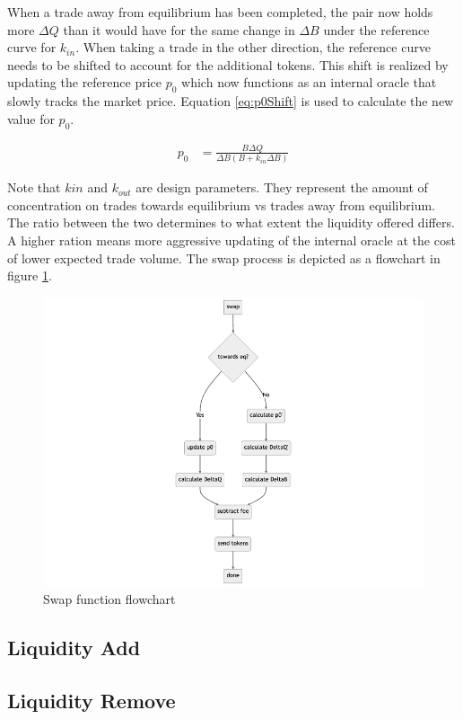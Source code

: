 When a trade away from equilibrium has been completed, the pair now holds more $\Delta Q$ than it would have for the same change in $\Delta B$ under the reference curve for $k_{in}$. When taking a trade in the other direction, the reference curve needs to be shifted to account for the additional tokens. This shift is realized by updating the reference price $p_0$ which now functions as an internal oracle that slowly tracks the market price. Equation \ref{eq:p0Shift} is used to calculate the new value for $p_0$.

\begin{align} \label{eq:p0Shift}
  p_0 &= \frac{B \Delta Q}{\Delta B \left( B + k_{in} \Delta B \right)}
\end{align}

Note that $k{in}$ and $k_{out}$ are design parameters. They represent the amount of concentration on trades towards equilibrium vs trades away from equilibrium. The ratio between the two determines to what extent the liquidity offered differs. A higher ration means more aggressive updating of the internal oracle at the cost of lower expected trade volume. The swap process is depicted as a flowchart in figure \ref{fig:flowchart}.

\begin{figure} 
  \centering
    \includegraphics[scale=0.5]{flowchart.png} 
    \caption{Swap function flowchart}
      \label{fig:flowchart}
\end{figure}


\subsection{Liquidity Add}

\subsection{Liquidity Remove}
